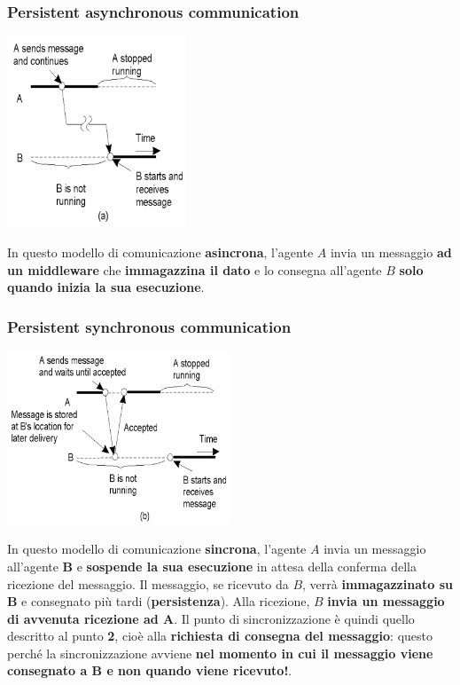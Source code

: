\documentclass[12pt]{article}
\begin{document}
\subsubsection{Persistent asynchronous communication}
\begin{center}
    \includegraphics[width = 0.40\textwidth]{Images/131.PNG}
\end{center}
In questo modello di comunicazione \textbf{asincrona}, l'agente $A$ invia un messaggio \textbf{ad un middleware} che \textbf{immagazzina il dato} e lo consegna all'agente $B$ \textbf{solo quando inizia la sua esecuzione}.
\subsubsection{Persistent synchronous communication}
\begin{center}
    \includegraphics[width = 0.50\textwidth]{Images/132.PNG}
\end{center}
In questo modello di comunicazione \textbf{sincrona}, l'agente $A$ invia un messaggio all'agente \textbf{B} e \textbf{sospende la sua esecuzione} in attesa della conferma della ricezione del messaggio. Il messaggio, se ricevuto da $B$, verrà \textbf{immagazzinato su $\textbf{B}$} e consegnato più tardi (\textbf{persistenza}). Alla ricezione, $B$ \textbf{invia un messaggio di avvenuta ricezione ad $\textbf{A}$}. Il punto di sincronizzazione è quindi quello descritto al punto \textbf{2}, cioè alla \textbf{richiesta di consegna del messaggio}: questo perché la sincronizzazione avviene \textbf{nel momento in cui il messaggio viene consegnato a B e non quando viene ricevuto!}.
\newpage
\end{document}
